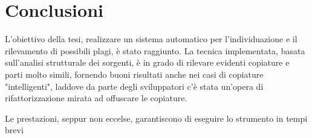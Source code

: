 \chapter{Conclusioni}
L'obiettivo della tesi, realizzare un sistema automatico per l'individuazione e il rilevamento di possibili plagi, è stato raggiunto.
%
La tecnica implementata, basata sull'analisi strutturale dei sorgenti, è in grado di rilevare evidenti copiature e parti molto simili, fornendo buoni risultati anche nei casi di copiature "intelligenti", laddove da parte degli sviluppatori c'è stata un'opera di rifattorizzazione mirata ad offuscare le copiature.

Le prestazioni, seppur non eccelse, garantiscono di eseguire lo strumento in tempi brevi
